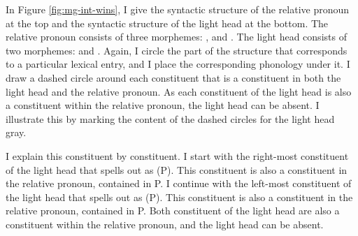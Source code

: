 In Figure \ref{fig:mg-int-wins}, I give the syntactic structure of the relative pronoun at the top and the syntactic structure of the light head at the bottom.
The relative pronoun consists of three morphemes: ,  and .
The light head consists of two morphemes:  and .
Again, I circle the part of the structure that corresponds to a particular lexical entry, and I place the corresponding phonology under it.
I draw a dashed circle around each constituent that is a constituent in both the light head and the relative pronoun.
As each constituent of the light head is also a constituent within the relative pronoun, the light head can be absent. I illustrate this by marking the content of the dashed circles for the light head gray.

I explain this constituent by constituent.
I start with the right-most constituent of the light head that spells out as  (P). This constituent is also a constituent in the relative pronoun, contained in P.
I continue with the left-most constituent of the light head that spells out as  (P). This constituent is also a constituent in the relative pronoun, contained in P.
Both constituent of the light head are also a constituent within the relative pronoun, and the light head can be absent.

